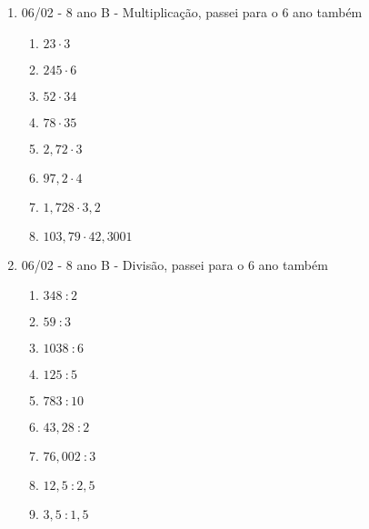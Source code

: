 \begin{enumerate}
\begin{enumerate}
		
	\end{enumerate}
	\item 06/02 - 8 ano B - Multiplicação, passei para o 6 ano também 
	\begin{enumerate}
		\item $23 \cdot 3$
		\item $245 \cdot 6$
		\item $52\cdot34$
		\item $78\cdot35$
		\item $2,72\cdot3$
		\item $97,2\cdot4$
		\item $1,728\cdot3,2$		
		\item $103,79\cdot42,3001$
		
	\end{enumerate}
	
	\item 06/02 - 8 ano B - Divisão, passei para o 6 ano também 
	\begin{enumerate}
		\item $348 \ : 2$
		\item $59\ : 3$
		\item $1038 \ : 6$
		\item $125\ : 5$
		\item $783\ : 10$
		\item $43,28\ : 2$
		\item $76,002\ : 3$
		\item $12,5\ : 2,5$
		\item $3,5 \ : 1,5$
		
	\end{enumerate}
	
\end{enumerate}


